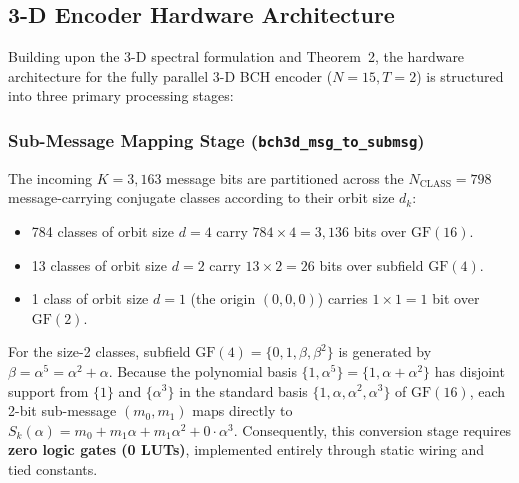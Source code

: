 \documentclass[journal]{IEEEtran}
\begin{document}

\subsection{3-D Encoder Hardware Architecture}
Building upon the 3-D spectral formulation and Theorem~2, the hardware architecture for the fully parallel 3-D BCH encoder ($N=15, T=2$) is structured into three primary processing stages:

\subsubsection{Sub-Message Mapping Stage (\texttt{bch3d\_msg\_to\_submsg})}
The incoming $K=3,163$ message bits are partitioned across the $N_{\text{CLASS}} = 798$ message-carrying conjugate classes according to their orbit size $d_k$:
\begin{itemize}
    \item 784 classes of orbit size $d=4$ carry $784 \times 4 = 3,136$ bits over $\text{GF}(16)$.
    \item 13 classes of orbit size $d=2$ carry $13 \times 2 = 26$ bits over subfield $\text{GF}(4)$.
    \item 1 class of orbit size $d=1$ (the origin $(0,0,0)$) carries $1 \times 1 = 1$ bit over $\text{GF}(2)$.
\end{itemize}
For the size-2 classes, subfield $\text{GF}(4) = \{0, 1, \beta, \beta^2\}$ is generated by $\beta = \alpha^5 = \alpha^2 + \alpha$. Because the polynomial basis $\{1, \alpha^5\} = \{1, \alpha + \alpha^2\}$ has disjoint support from $\{1\}$ and $\{\alpha^3\}$ in the standard basis $\{1, \alpha, \alpha^2, \alpha^3\}$ of $\text{GF}(16)$, each 2-bit sub-message $(m_0, m_1)$ maps directly to $S_k(\alpha) = m_0 + m_1 \alpha + m_1 \alpha^2 + 0 \cdot \alpha^3$. Consequently, this conversion stage requires \textbf{zero logic gates (0 LUTs)}, implemented entirely through static wiring and tied constants.
\end{document}

